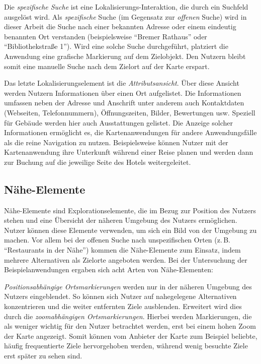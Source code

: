 Die \emph{spezifische Suche} ist eine Lokalisierungs-Interaktion, die durch ein Suchfeld ausgelöst wird.
Als \emph{spezifische} Suche (im Gegensatz zur \emph{offenen} Suche) wird in dieser Arbeit die Suche nach einer bekannten Adresse oder einem eindeutig benannten Ort verstanden (beispielsweise \enquote{Bremer Rathaus} oder \enquote{Bibliothekstraße 1}).
Wird eine solche Suche durchgeführt, platziert die Anwendung eine grafische Markierung auf dem Zielobjekt.
Den Nutzern bleibt somit eine manuelle Suche nach dem Zielort auf der Karte erspart.

Das letzte Lokalisierungselement ist die \emph{Attributsansicht}.
Über diese Ansicht werden Nutzern Informationen über einen Ort aufgelistet.
Die Informationen umfassen neben der Adresse und Anschrift unter anderem auch Kontaktdaten (Webseiten, Telefonnummern), Öffnungszeiten, Bilder, Bewertungen usw.
Speziell für Gebäude werden hier auch Ausstattungen gelistet.
Die Anzeige solcher Informationen ermöglicht es, die Kartenanwendungen für andere Anwendungsfälle als die reine Navigation zu nutzen.
Beispielsweise können Nutzer mit der Kartenanwendung ihre Unterkunft während einer Reise planen und werden dann zur Buchung auf die jeweilige Seite des Hotels weitergeleitet.

\subsection{Nähe-Elemente}
\label{ssec:prox-elements}
Nähe-Elemente sind Explorationselemente, die im Bezug zur Position des Nutzers stehen und eine Übersicht der näheren Umgebung des Nutzers ermöglichen.
Nutzer können diese Elemente verwenden, um sich ein Bild von der Umgebung zu machen.
Vor allem bei der offenen Suche nach unspezifischen Orten (z.\,B. \enquote{Restaurants in der Nähe}) kommen die Nähe-Elemente zum Einsatz, indem mehrere Alternativen als Zielorte angeboten werden.
Bei der Untersuchung der Beispielanwendungen ergaben sich acht Arten von Nähe-Elementen:

\emph{Positionsabhängige Ortsmarkierungen} werden nur in der näheren Umgebung des Nutzers eingeblendet.
So können sich Nutzer auf nahegelegene Alternativen konzentrieren und die weiter entfernten Ziele ausblenden.
Erweitert wird dies durch die \emph{zoomabhängigen Ortsmarkierungen}.
Hierbei werden Markierungen, die als weniger wichtig für den Nutzer betrachtet werden, erst bei einem hohen Zoom der Karte angezeigt.
Somit können vom Anbieter der Karte zum Beispiel beliebte, häufig frequentierte Ziele hervorgehoben werden, während wenig besuchte Ziele erst später zu sehen sind.


